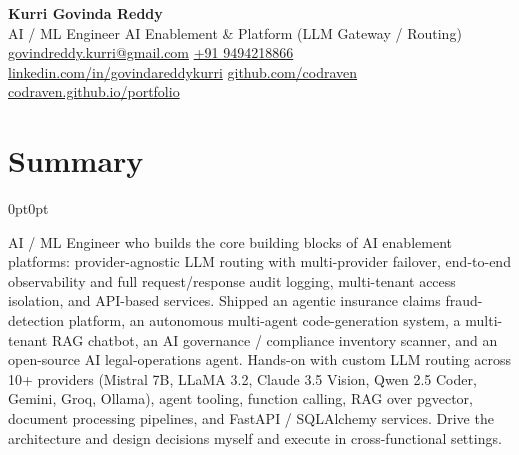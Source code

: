 \documentclass[10pt, letterpaper]{article}
\newenvironment{onecolentry}{
    \begin{adjustwidth}{0pt}{0pt}
}{
    \end{adjustwidth}
}
\begin{document}
\begin{center}
    {\fontsize{22pt}{22pt}\selectfont\textbf{Kurri Govinda Reddy}}\\[6pt]
    \normalsize
    AI / ML Engineer \textbar{} AI Enablement \& Platform (LLM Gateway / Routing)\\[3pt]
    \href{mailto:govindreddy.kurri@gmail.com}{govindreddy.kurri@gmail.com}
    \textbar{}
    \href{tel:+9494218866}{+91 9494218866}
    \textbar{}
    \href{https://www.linkedin.com/in/govindareddykurri/}{linkedin.com/in/govindareddykurri}
    \textbar{}
    \href{https://github.com/codraven}{github.com/codraven}
    \textbar{}
    \href{https://codraven.github.io/portfolio/}{codraven.github.io/portfolio}
\end{center}

\vspace{-4pt}

\section{Summary}
\begin{onecolentry}
AI / ML Engineer who builds the core building blocks of AI enablement platforms: provider-agnostic LLM routing with multi-provider failover, end-to-end observability and full request/response audit logging, multi-tenant access isolation, and API-based services. Shipped an agentic insurance claims fraud-detection platform, an autonomous multi-agent code-generation system, a multi-tenant RAG chatbot, an AI governance / compliance inventory scanner, and an open-source AI legal-operations agent. Hands-on with custom LLM routing across 10+ providers (Mistral 7B, LLaMA 3.2, Claude 3.5 Vision, Qwen 2.5 Coder, Gemini, Groq, Ollama), agent tooling, function calling, RAG over pgvector, document processing pipelines, and FastAPI / SQLAlchemy services. Drive the architecture and design decisions myself and execute in cross-functional settings.
\end{onecolentry}
\end{document}
